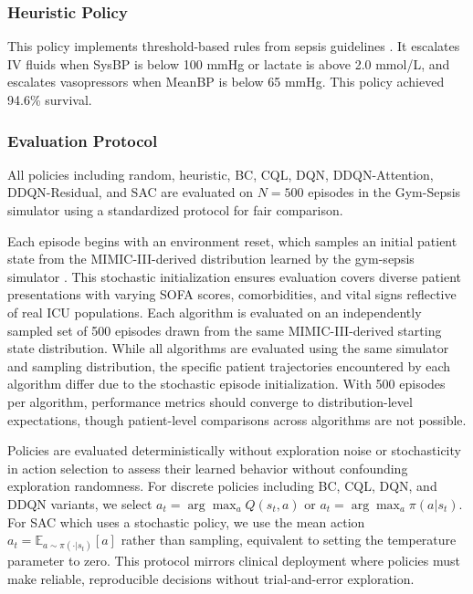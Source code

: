 \subsubsection{Heuristic Policy}

This policy implements threshold-based rules from sepsis guidelines \citep{rhodes2017ssc}. It escalates IV fluids when SysBP is below 100 mmHg or lactate is above 2.0 mmol/L, and escalates vasopressors when MeanBP is below 65 mmHg. This policy achieved 94.6\% survival.

\subsubsection{Evaluation Protocol}

All policies including random, heuristic, BC, CQL, DQN, DDQN-Attention, DDQN-Residual, and SAC are evaluated on $N = 500$ episodes in the Gym-Sepsis simulator using a standardized protocol for fair comparison.

Each episode begins with an environment reset, which samples an initial patient state from the MIMIC-III-derived distribution learned by the gym-sepsis simulator \citep{raghu2017sepsis_drl}. This stochastic initialization ensures evaluation covers diverse patient presentations with varying SOFA scores, comorbidities, and vital signs reflective of real ICU populations. Each algorithm is evaluated on an independently sampled set of 500 episodes drawn from the same MIMIC-III-derived starting state distribution. While all algorithms are evaluated using the same simulator and sampling distribution, the specific patient trajectories encountered by each algorithm differ due to the stochastic episode initialization. With 500 episodes per algorithm, performance metrics should converge to distribution-level expectations, though patient-level comparisons across algorithms are not possible.

Policies are evaluated deterministically without exploration noise or stochasticity in action selection to assess their learned behavior without confounding exploration randomness. For discrete policies including BC, CQL, DQN, and DDQN variants, we select $a_t = \arg\max_a Q(s_t, a)$ or $a_t = \arg\max_a \pi(a|s_t)$. For SAC which uses a stochastic policy, we use the mean action $a_t = \mathbb{E}_{a \sim \pi(\cdot|s_t)}[a]$ rather than sampling, equivalent to setting the temperature parameter to zero. This protocol mirrors clinical deployment where policies must make reliable, reproducible decisions without trial-and-error exploration.

